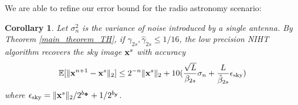 \documentclass{article}
\newtheorem{corollary}{Corollary}
\begin{document}

We are able to refine our error bound for the radio astronomy scenario:

\begin{corollary}
Let $\sigma_n^2$ is the variance of noise introduced by a single antenna. By Theorem \ref{main_theorem_TH}, if ${\gamma}_{2s}, \hat{\gamma}_{2s}\leq 1/16$, the low precision NIHT algorithm recovers the sky image ${\bf x}^s$ with accuracy
\begin{equation}
    \mathbb{E}[\|{\bf x}^{n+1} - {\bf x}^s \|_2] \leq 2^{-n}\| {\bf x}^s\|_2 + 10(\frac{\sqrt{L}}{\beta_{2s}}\sigma_n+\frac{L}{\hat{\beta}_{2s}}\epsilon_{\rm{sky}})
\end{equation}
where $\epsilon_{\rm{sky}} =  \|{\bf x}^s \|_2/2^{b_{\bf \Phi}} + 1/2^{b_{\bf y}}$.
\label{corollary1}
\end{corollary}


\end{document}
